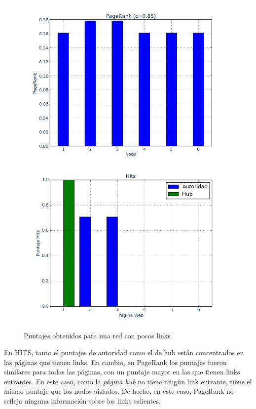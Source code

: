 \documentclass[a4paper]{article}
\begin{document}
\begin{figure}[htbp]
\centering
\includegraphics[scale=0.385]{img/PocosLinksout.png}
\includegraphics[scale=0.385]{img/PocosLinksoutH.png}
\caption{Puntajes obtenidos para una red con pocos links}
\end{figure}

En HITS, tanto el puntajes de autoridad como el de hub están concentrados en las páginas que tienen links. En cambio, en PageRank los puntajes fueron similares para todas las páginas, con un puntaje mayor en las que tienen links entrantes. En este caso, como la \textit{página hub} no tiene ningún link entrante, tiene el mismo puntaje que los nodos aislados. De hecho, en este caso, PageRank no refleja ninguna información sobre los links salientes.
\end{document}
